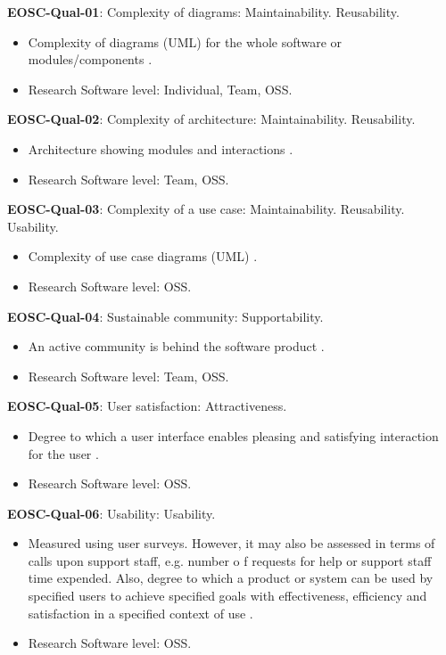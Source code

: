 \textbf{EOSC-Qual-01}: Complexity of diagrams: Maintainability. Reusability.

\begin{itemize}
    \item Complexity of diagrams (UML) for the whole software or modules/components \cite{montagud_systematic_2012}.
    \item Research Software level: Individual, Team, OSS.
\end{itemize}

\textbf{EOSC-Qual-02}: Complexity of architecture: Maintainability. Reusability.

\begin{itemize}
    \item Architecture showing modules and interactions \cite{montagud_systematic_2012,zuser_software_2005}.
    \item Research Software level: Team, OSS.
\end{itemize}

\textbf{EOSC-Qual-03}: Complexity of a use case: Maintainability. Reusability. Usability.

\begin{itemize}
    \item Complexity of use case diagrams (UML) \cite{montagud_systematic_2012}.
    \item Research Software level: OSS.
\end{itemize}

\textbf{EOSC-Qual-04}: Sustainable community: Supportability.

\begin{itemize}
    \item An active community is behind the software product \cite{aberdour_achieving_2007}.
    \item Research Software level: Team, OSS.
\end{itemize}

\textbf{EOSC-Qual-05}: User satisfaction: Attractiveness.

\begin{itemize}
    \item Degree to which a user interface enables pleasing and satisfying interaction for the user \cite{iso_25010_2011_2017,zuser_software_2005}.
    \item Research Software level: OSS.
\end{itemize}

\textbf{EOSC-Qual-06}: Usability: Usability.

\begin{itemize}
    \item Measured using user surveys. However, it may also be assessed in terms of calls upon support staff, e.g. number o f requests for help or support staff time expended. Also, degree to which a product or system can be used by specified users to achieve specified goals with effectiveness, efficiency and satisfaction in a specified context of use \cite{iso_25010_2011_2017,zuser_software_2005,gillies_modelling_1992,boehm_quantitative_1976}.
    \item Research Software level: OSS.
\end{itemize}

